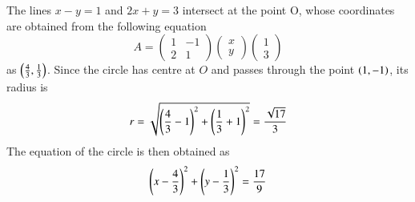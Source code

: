 The lines $x-y=1$ and $2x+y=3$ intersect at the point O, whose coordinates are obtained from the following equation
\begin{equation}
A =
\begin{pmatrix}
1 & -1
\\
 2 & 1
\end{pmatrix}
\begin{pmatrix}
x
\\
y
\end{pmatrix}
\begin{pmatrix}
1 
\\
 3
\end{pmatrix}
\end{equation}
as $\left(\frac{4}{3},\frac{1}{3}\right)$.  Since the circle has centre at $O$ and passes through the point $\left(1,-1\right)$, its radius is
%
\begin{equation}
r = \sqrt{\left(\frac{4}{3}-1\right)^2+\left(\frac{1}{3}+1\right)^2} = \frac{\sqrt{17}}{3}
\end{equation}
%
The equation of the circle is then obtained as
%
\begin{equation}
\left(x-\frac{4}{3}\right)^2+\left(y-\frac{1}{3}\right)^2=\frac{17}{9}
\end{equation}
% 
%    
